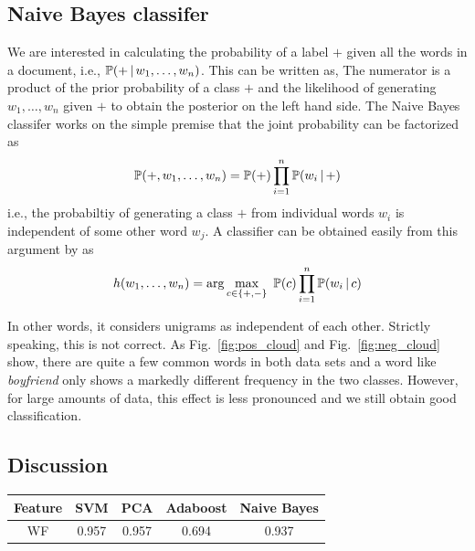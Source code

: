 \documentclass[11pt, letterpaper, conference, final, twocolumn]{ieeeconf}
\begin{document}
\subsection{Naive Bayes classifer}
\label{ssec:naive_bayes}
%
We are interested in calculating the probability of a label $+$ given all the words in a document, i.e., $\mathbb{P}(+ \, \vert \, w_1, \ldots, w_n)$. This can be written as,
The numerator is a product of the prior probability of a class $+$ and the likelihood of generating $w_1, \ldots, w_n$ given $+$ to obtain the posterior on the left hand side. The Naive Bayes classifer works on the simple premise that the joint probability can be factorized as
$$
\mathbb{P}(+, w_1, \ldots, w_n) = \mathbb{P}(+) \prod_{i=1}^n \mathbb{P}(w_i \, \vert \, +)
$$
i.e., the probabiltiy of generating a class $+$ from individual words $w_i$ is independent of some other word $w_j$. A classifier can be obtained easily from this argument by as
$$
h(w_1, \ldots, w_n) = \arg \max_{c \in \{ +, - \} }\ \mathbb{P}(c) \prod_{i=1}^n \mathbb{P}(w_i \, \vert \, c)
$$

In other words, it considers unigrams as independent of each other. Strictly speaking, this is not correct. As Fig.~\ref{fig:pos_cloud} and Fig.~\ref{fig:neg_cloud} show, there are quite a few common words in both data sets and a word like \emph{boyfriend} only shows a markedly different frequency in the two classes. However, for large amounts of data, this effect is less pronounced and we still obtain good classification.

\subsection{Discussion}
\label{ssec:discussion}


\begin{table}
\centering
\begin{tabular}{ |c|c|c|c|c| }
  \hline
  Feature & SVM & PCA & Adaboost & Naive Bayes \\[0.03in]
  \hline
  WF & 0.957 & 0.957 & 0.694 & 0.937\\
  \hline
\end{tabular}
\end{table}
\end{document}
